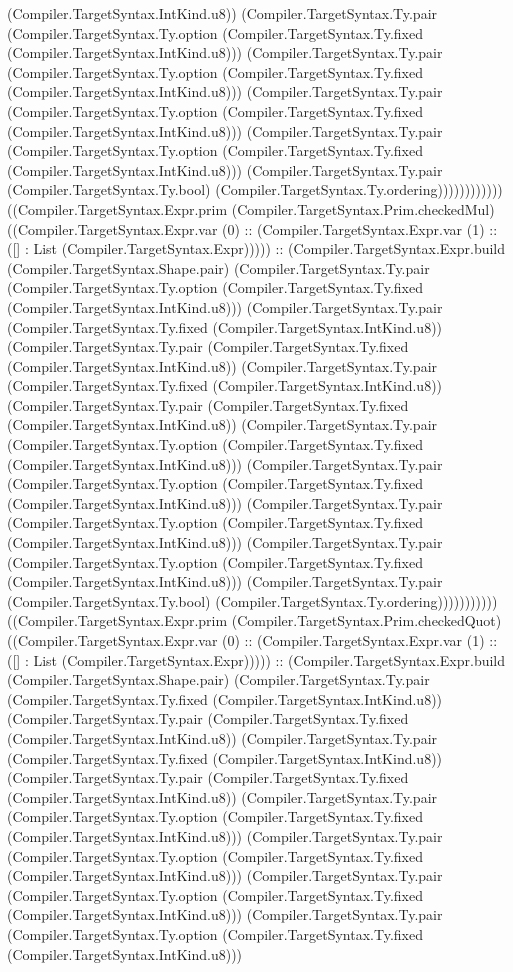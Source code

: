 \documentclass[11pt]{article}
\begin{document}
(Compiler.TargetSyntax.IntKind.u8)) (Compiler.TargetSyntax.Ty.pair (Compiler.TargetSyntax.Ty.option (Compiler.TargetSyntax.Ty.fixed (Compiler.TargetSyntax.IntKind.u8))) (Compiler.TargetSyntax.Ty.pair (Compiler.TargetSyntax.Ty.option (Compiler.TargetSyntax.Ty.fixed (Compiler.TargetSyntax.IntKind.u8))) (Compiler.TargetSyntax.Ty.pair (Compiler.TargetSyntax.Ty.option (Compiler.TargetSyntax.Ty.fixed (Compiler.TargetSyntax.IntKind.u8))) (Compiler.TargetSyntax.Ty.pair (Compiler.TargetSyntax.Ty.option (Compiler.TargetSyntax.Ty.fixed (Compiler.TargetSyntax.IntKind.u8))) (Compiler.TargetSyntax.Ty.pair (Compiler.TargetSyntax.Ty.bool) (Compiler.TargetSyntax.Ty.ordering)))))))))))) ((Compiler.TargetSyntax.Expr.prim (Compiler.TargetSyntax.Prim.checkedMul) ((Compiler.TargetSyntax.Expr.var (0) :: (Compiler.TargetSyntax.Expr.var (1) :: ([] : List (Compiler.TargetSyntax.Expr))))) :: (Compiler.TargetSyntax.Expr.build (Compiler.TargetSyntax.Shape.pair) (Compiler.TargetSyntax.Ty.pair (Compiler.TargetSyntax.Ty.option (Compiler.TargetSyntax.Ty.fixed (Compiler.TargetSyntax.IntKind.u8))) (Compiler.TargetSyntax.Ty.pair (Compiler.TargetSyntax.Ty.fixed (Compiler.TargetSyntax.IntKind.u8)) (Compiler.TargetSyntax.Ty.pair (Compiler.TargetSyntax.Ty.fixed (Compiler.TargetSyntax.IntKind.u8)) (Compiler.TargetSyntax.Ty.pair (Compiler.TargetSyntax.Ty.fixed (Compiler.TargetSyntax.IntKind.u8)) (Compiler.TargetSyntax.Ty.pair (Compiler.TargetSyntax.Ty.fixed (Compiler.TargetSyntax.IntKind.u8)) (Compiler.TargetSyntax.Ty.pair (Compiler.TargetSyntax.Ty.option (Compiler.TargetSyntax.Ty.fixed (Compiler.TargetSyntax.IntKind.u8))) (Compiler.TargetSyntax.Ty.pair (Compiler.TargetSyntax.Ty.option (Compiler.TargetSyntax.Ty.fixed (Compiler.TargetSyntax.IntKind.u8))) (Compiler.TargetSyntax.Ty.pair (Compiler.TargetSyntax.Ty.option (Compiler.TargetSyntax.Ty.fixed (Compiler.TargetSyntax.IntKind.u8))) (Compiler.TargetSyntax.Ty.pair (Compiler.TargetSyntax.Ty.option (Compiler.TargetSyntax.Ty.fixed (Compiler.TargetSyntax.IntKind.u8))) (Compiler.TargetSyntax.Ty.pair (Compiler.TargetSyntax.Ty.bool) (Compiler.TargetSyntax.Ty.ordering))))))))))) ((Compiler.TargetSyntax.Expr.prim (Compiler.TargetSyntax.Prim.checkedQuot) ((Compiler.TargetSyntax.Expr.var (0) :: (Compiler.TargetSyntax.Expr.var (1) :: ([] : List (Compiler.TargetSyntax.Expr))))) :: (Compiler.TargetSyntax.Expr.build (Compiler.TargetSyntax.Shape.pair) (Compiler.TargetSyntax.Ty.pair (Compiler.TargetSyntax.Ty.fixed (Compiler.TargetSyntax.IntKind.u8)) (Compiler.TargetSyntax.Ty.pair (Compiler.TargetSyntax.Ty.fixed (Compiler.TargetSyntax.IntKind.u8)) (Compiler.TargetSyntax.Ty.pair (Compiler.TargetSyntax.Ty.fixed (Compiler.TargetSyntax.IntKind.u8)) (Compiler.TargetSyntax.Ty.pair (Compiler.TargetSyntax.Ty.fixed (Compiler.TargetSyntax.IntKind.u8)) (Compiler.TargetSyntax.Ty.pair (Compiler.TargetSyntax.Ty.option (Compiler.TargetSyntax.Ty.fixed (Compiler.TargetSyntax.IntKind.u8))) (Compiler.TargetSyntax.Ty.pair (Compiler.TargetSyntax.Ty.option (Compiler.TargetSyntax.Ty.fixed (Compiler.TargetSyntax.IntKind.u8))) (Compiler.TargetSyntax.Ty.pair (Compiler.TargetSyntax.Ty.option (Compiler.TargetSyntax.Ty.fixed (Compiler.TargetSyntax.IntKind.u8))) (Compiler.TargetSyntax.Ty.pair (Compiler.TargetSyntax.Ty.option (Compiler.TargetSyntax.Ty.fixed (Compiler.TargetSyntax.IntKind.u8))) 
\end{document}
